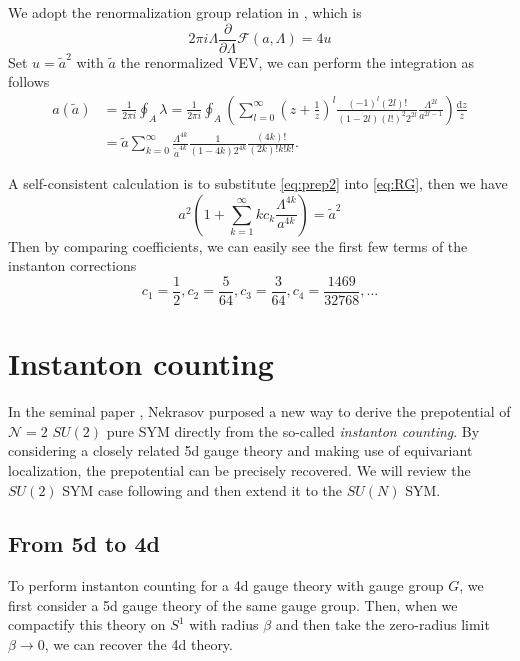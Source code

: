 \documentclass{article}
\begin{document}
We adopt the renormalization group relation in \cite{Matone:1995rx}, which is 
\begin{equation}
\label{eq:RG}
2 \pi i \Lambda \frac{\partial}{\partial \Lambda} \mathscr{F}(a, \Lambda)=4 u
\end{equation}
Set $u=\tilde{a}^2$ with $\tilde{a}$ the renormalized VEV, we can perform the integration as follows
\begin{equation}
\begin{aligned}
a(\tilde{a}) &=\frac{1}{2 \pi i} \oint_{A} \lambda=\frac{1}{2 \pi i} \oint_{A}\left(\sum_{l=0}^{\infty}\left(z+\frac{1}{z}\right)^{l} \frac{(-1)^{l}(2 l) !}{(1-2 l)(l !)^{2} 2^{2 l}} \frac{\Lambda^{2 l}}{a^{2 l-1}}\right) \frac{\mathrm{d} z}{z} \\
&=\tilde{a} \sum_{k=0}^{\infty} \frac{\Lambda^{4 k}}{\tilde{a}^{4 k}} \frac{1}{(1-4 k) 2^{4 k}} \frac{(4 k) !}{(2 k) ! k ! k !}.
\end{aligned}
\end{equation}

A self-consistent calculation is to substitute \eqref{eq:prep2} into \eqref{eq:RG}, then we have 
\begin{equation}
a^{2}\left(1+\sum_{k=1}^{\infty} k c_{k} \frac{\Lambda^{4 k}}{a^{4 k}}\right)=\tilde{a}^{2}
\end{equation}
Then by comparing coefficients, we can easily see the first few terms of the instanton corrections
\begin{equation}
\label{eq:coeff}
c_{1}=\frac{1}{2}, c_{2}=\frac{5}{64}, c_{3}=\frac{3}{64}, c_{4}=\frac{1469}{32768}, \ldots
\end{equation}

\section{Instanton counting}
In the seminal paper \cite{Nekrasov:2002qd}, Nekrasov purposed a new way to derive the prepotential of $\mathcal{N}=2$ $SU(2)$ pure SYM directly from the so-called \emph{instanton counting}. By considering a closely related 5d gauge theory and making use of equivariant localization, the prepotential can be precisely recovered. We will review the $SU(2)$ SYM case following \cite{Tac15} and then extend it to the $SU(N)$ SYM.

\subsection{From 5d to 4d}
To perform instanton counting for a 4d gauge theory with gauge group $G$, we first consider a 5d gauge theory of the same gauge group. Then, when we compactify this theory on $S^1$ with radius $\beta$ and then take the zero-radius limit $\beta\to 0$, we can recover the 4d theory.
\end{document}
